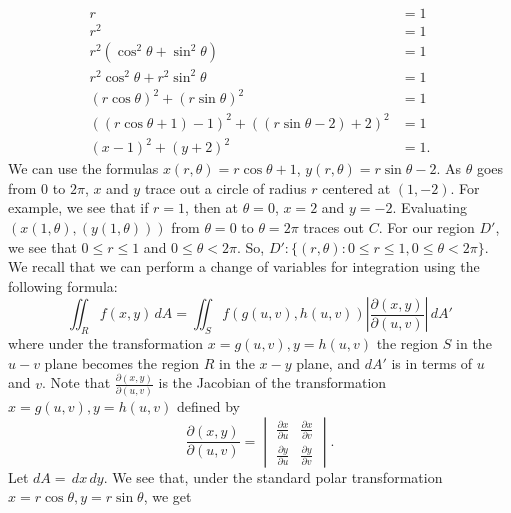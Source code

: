 \begin{align*}
    r & = 1 \\
    r^2 & = 1 \\
    r^2(\cos^2\theta + \sin^2\theta) & = 1 \\
    r^2\cos^2\theta + r^2\sin^2\theta & = 1 \\
    (r\cos\theta)^2 + (r\sin\theta)^2 & = 1 \\
    ((r\cos\theta + 1) - 1)^2 + ((r\sin\theta - 2) + 2)^2 & = 1 \\
    (x-1)^2 + (y+2)^2 & = 1.
\end{align*}
We can use the formulas $x(r,\theta) = r\cos\theta + 1$, $y(r,\theta) = r\sin\theta - 2$. As $\theta$ goes from $0$ to $2\pi$, $x$ and $y$ trace out a circle of radius $r$ centered at $(1,-2)$. For example, we see that if $r=1$, then at $\theta = 0$, $x = 2$ and $y = -2$. Evaluating $(x(1,\theta),(y(1,\theta)))$ from $\theta = 0$ to $\theta = 2\pi$ traces out $C$. For our region $D'$, we see that $0 \leq r \leq 1$ and $0 \leq \theta < 2\pi$. So, $D': \{(r,\theta): 0 \leq r \leq 1, 0 \leq \theta < 2\pi \}$. We recall that we can perform a change of variables for integration using the following formula:
\begin{equation*}
    \iint_R f(x,y) \,dA = \iint_S f(g(u,v),h(u,v))\left| \frac{\partial(x,y)}{\partial(u,v)} \right| \,dA'
\end{equation*}
where under the transformation $x=g(u,v),y=h(u,v)$ the region $S$ in the $u-v$ plane becomes the region $R$ in the $x-y$ plane, and $dA'$ is in terms of $u$ and $v$. Note that $\frac{\partial(x,y)}{\partial(u,v)}$ is the Jacobian of the transformation $x = g(u,v),y = h(u,v)$ defined by
\begin{equation*}
    \frac{\partial(x,y)}{\partial(u,v)} = 
        \begin{vmatrix}
            \frac{\partial x}{\partial u} & \frac{\partial x}{\partial v} \\
            \frac{\partial y}{\partial u} & \frac{\partial y}{\partial v}
        \end{vmatrix}.
\end{equation*}
Let $dA = \,dx\,dy$. We see that, under the standard polar transformation $x=r\cos\theta,y=r\sin\theta$, we get
